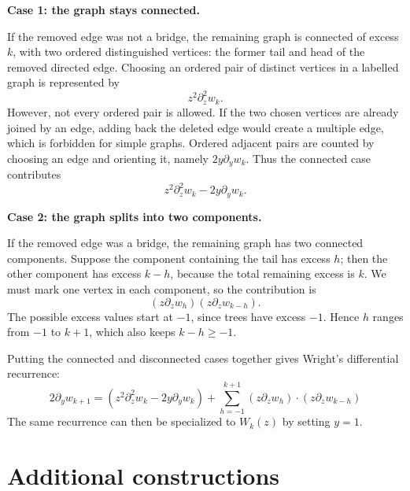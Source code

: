 \textbf{Case 1: the graph stays connected.}

If the removed edge was not a bridge, the remaining graph is connected of excess $k$, with two
ordered distinguished vertices: the former tail and head of the removed directed edge. Choosing
an ordered pair of distinct vertices in a labelled graph is represented by
\begin{equation*}
    z^2\partial_z^2 w_k.
\end{equation*}
However, not every ordered pair is allowed. If the two chosen vertices are already joined by an
edge, adding back the deleted edge would create a multiple edge, which is forbidden for simple
graphs. Ordered adjacent pairs are counted by choosing an edge and orienting it, namely
$2y\partial_y w_k$. Thus the connected case contributes
\begin{equation*}
    z^2\partial_z^2 w_k - 2y\partial_y w_k.
\end{equation*}

\textbf{Case 2: the graph splits into two components.}

If the removed edge was a bridge, the remaining graph has two connected components. Suppose
the component containing the tail has excess $h$; then the other component has excess $k-h$,
because the total remaining excess is $k$. We must mark one vertex in each component, so the
contribution is
\begin{equation*}
    \left(z\partial_z w_h\right)\left(z\partial_z w_{k-h}\right).
\end{equation*}
The possible excess values start at $-1$, since trees have excess $-1$. Hence $h$ ranges from
$-1$ to $k+1$, which also keeps $k-h \geq -1$.

Putting the connected and disconnected cases together gives Wright's differential recurrence:
\begin{equation*}
    2\partial_{y}w_{k + 1} = \left(z^{2}\partial_{z}^{2}w_{k} - 2y\partial_{y}w_{k}\right) +
        \sum_{h = -1}^{k + 1} \left(z\partial_{z}w_{h}\right) \cdot \left(z\partial_{z}w_{k - h}\right)
\end{equation*}
The same recurrence can then be specialized to $W_k(z)$ by setting $y=1$.

\section{Additional constructions}

